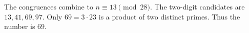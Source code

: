 The congruences combine to $n\equiv13\pmod{28}$. The two-digit candidates are $13,41,69,97$. Only $69=3\cdot23$ is a product of two distinct primes. Thus the number is $\boxed{69}$.
